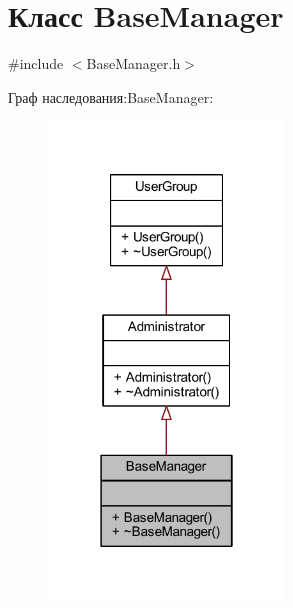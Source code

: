 \hypertarget{class_base_manager}{}\section{Класс Base\+Manager}
\label{class_base_manager}


{\ttfamily \#include $<$Base\+Manager.\+h$>$}



Граф наследования\+:Base\+Manager\+:\nopagebreak
\begin{figure}[H]
\begin{center}
\leavevmode
\includegraphics[width=178pt]{d9/db8/class_base_manager__inherit__graph}
\end{center}
\end{figure}


